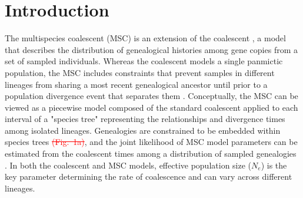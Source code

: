 \documentclass[11pt]{article}
\begin{document}
\section{Introduction}
The multispecies coalescent (MSC) is an extension of the coalescent 
\citep{kingman1982coalescent}, a model that describes the distribution of genealogical 
histories among gene copies from a set of sampled individuals. Whereas the 
coalescent models a single panmictic population, the MSC includes constraints that prevent 
samples in different lineages from sharing a most recent genealogical ancestor until prior
to a population divergence event that separates them \citep{maddison1997gene,maddison2006inferring}. 
Conceptually, the MSC can be viewed as a piecewise model composed of the standard
coalescent applied to each interval of a "species tree" representing the relationships
and divergence times among isolated lineages. Genealogies are constrained to be
embedded within species trees
\textcolor{red}{\sout{(Fig.~1a)}}, and the joint likelihood of 
MSC model parameters can be estimated from the coalescent times among a 
distribution of sampled genealogies
% 
\citep{rannala2003bayes,degnan2009gene}. In both the coalescent
and MSC models, effective population size ($N_e$) is the key parameter determining 
the rate of coalescence and can vary across different lineages. 

\end{document}
